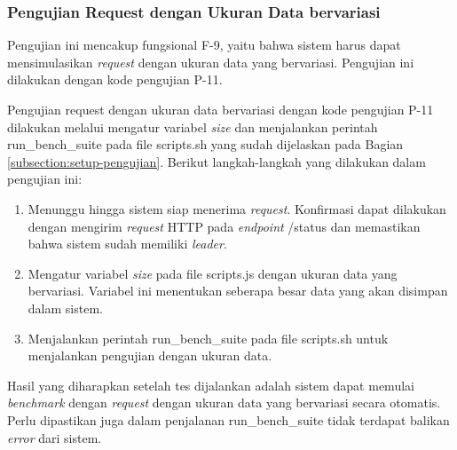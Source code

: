 \subsubsection{Pengujian Request dengan Ukuran Data bervariasi}
\label{subsubsection:pengujian-request-ukuran-data}

Pengujian ini mencakup fungsional F-9, yaitu bahwa sistem harus dapat mensimulasikan \textit{request} dengan ukuran data yang bervariasi. Pengujian ini dilakukan dengan kode pengujian P-11.

Pengujian request dengan ukuran data bervariasi dengan kode pengujian P-11 dilakukan melalui mengatur variabel \textit{size} dan menjalankan perintah run\_bench\_suite pada file scripts.sh yang sudah dijelaskan pada Bagian \ref{subsection:setup-pengujian}. Berikut langkah-langkah yang dilakukan dalam pengujian ini:

\begin{enumerate}
    \item Menunggu hingga sistem siap menerima \textit{request}. Konfirmasi dapat dilakukan dengan mengirim \textit{request} HTTP pada \textit{endpoint} /status dan memastikan bahwa sistem sudah memiliki \textit{leader}.
    \item Mengatur variabel \textit{size} pada file scripts.js dengan ukuran data yang bervariasi. Variabel ini menentukan seberapa besar data yang akan disimpan dalam sistem.
    \item Menjalankan perintah run\_bench\_suite pada file scripts.sh untuk menjalankan pengujian dengan ukuran data.
\end{enumerate}

Hasil yang diharapkan setelah tes dijalankan adalah sistem dapat memulai \textit{benchmark} dengan \textit{request} dengan ukuran data yang bervariasi secara otomatis. Perlu dipastikan juga dalam penjalanan run\_bench\_suite tidak terdapat balikan \textit{error} dari sistem.
